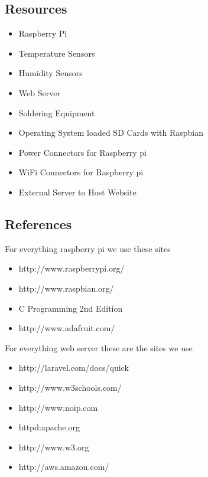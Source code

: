 \documentclass{report}
\begin{document}
\subsection*{Resources}
\newpage

\begin{itemize}
\item Raspberry Pi
\item Temperature Sensors
\item Humidity Sensors
\item Web Server
\item Soldering Equipment
\item Operating System loaded SD Cards with Raspbian
\item Power Connectors for Raspberry pi
\item WiFi Connectors for Raspberry pi
\item External Server to Host Website
\end{itemize}
\newpage


\subsection*{References}
For everything raspberry pi we use these sites
\begin{itemize}
\item http://www.raspberrypi.org/
\item http://www.raspbian.org/
\item C Programming 2nd Edition
\item http://www.adafruit.com/
\end{itemize}
For everything web server these are the sites we use
\begin{itemize}
\item http://laravel.com/docs/quick
\item http://www.w3schools.com/
\item http://www.noip.com
\item httpd:apache.org
\item http://www.w3.org
\item http://aws.amazon.com/
\end{itemize}
\newpage
\end{document}
